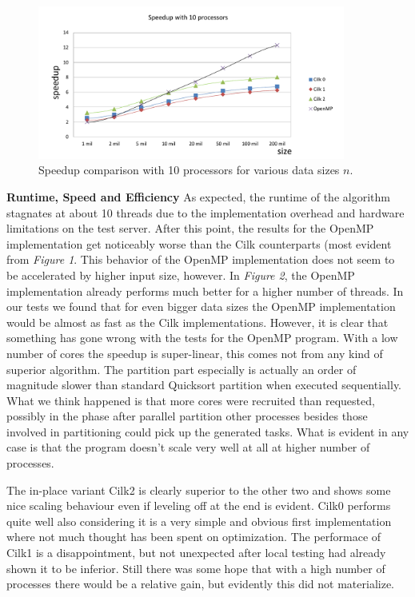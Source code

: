 \documentclass[12pt,a4paper]{article}
\begin{document}
\begin{figure}[h]
	\includegraphics[width=0.9\textwidth]{img/omp_cilk_speedup_10p.pdf}
	\caption{Speedup comparison with 10 processors for various data sizes $n$.}
\end{figure}

\noindent\textbf{Runtime, Speed and Efficiency}\newline
As expected, the runtime of the algorithm stagnates at about 10 threads due to the implementation overhead and hardware limitations on the test server. After this point, the results for the OpenMP implementation get noticeably worse than the Cilk counterparts (most evident from \emph{Figure 1}. This behavior of the OpenMP implementation does not seem to be accelerated by higher input size, however. In \emph{Figure 2}, the OpenMP implementation already performs much better for a higher number of threads. In our tests we found that for even bigger data sizes the OpenMP implementation would be almost as fast as the Cilk implementations. However, it is clear that something has gone wrong with the tests for the OpenMP program. With a low number of cores the speedup is super-linear, this comes not from any kind of superior algorithm. The partition part especially is actually an order of magnitude slower than standard Quicksort partition when executed sequentially. What we think happened is that more cores were recruited than requested, possibly in the phase after parallel partition other processes besides those involved in partitioning could pick up the generated tasks. What is evident in any case is that the program doesn't scale very well at all at higher number of processes.

The in-place variant Cilk2 is clearly superior to the other two and shows some nice scaling behaviour even if leveling off at the end is evident. Cilk0 performs quite well also considering it is a very simple and obvious first implementation where not much thought has been spent on optimization. The performace of Cilk1 is a disappointment, but not unexpected after local testing had already shown it to be inferior. Still there was some hope that with a high number of processes there would be a relative gain, but evidently this did not materialize.
\end{document}

